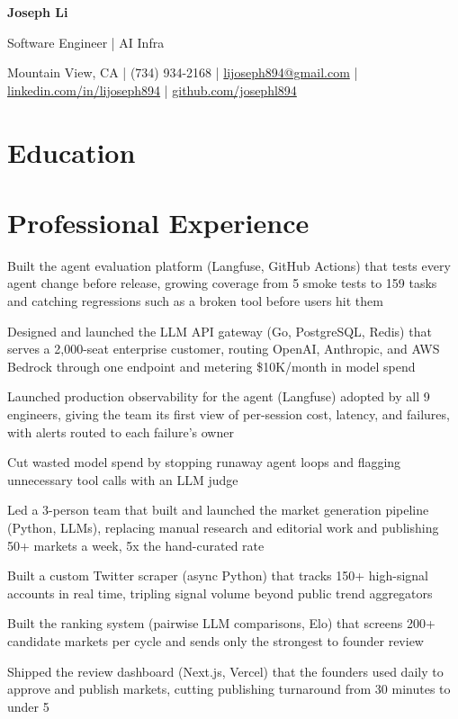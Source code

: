 \documentclass[10pt]{article}
\renewcommand{\resumeheader}[3]{%
  {\centering\fontsize{17}{19}\selectfont\bfseries\addfontfeature{LetterSpace=1.2}#1\par}%
  \vspace{3pt}%
  {\centering\fontsize{10.4}{12.5}\selectfont #2\par}%
  \vspace{2pt}%
  {\centering\fontsize{8.6}{10.4}\selectfont\color{subtle}#3\par}%
  \vspace{7pt}%
}
\begin{document}
\resumeheader{Joseph Li}{Software Engineer | AI Infra}{%
Mountain View, CA | (734) 934-2168 | \href{mailto:lijoseph894@gmail.com}{lijoseph894@gmail.com} | \href{https://www.linkedin.com/in/lijoseph894/}{linkedin.com/in/lijoseph894} | \href{https://github.com/josephl894}{github.com/josephl894}}

\section{Education}


\section{Professional Experience}
\begin{bullets}
  \item Built the agent evaluation platform (Langfuse, GitHub Actions) that tests every agent change before release, growing coverage from 5 smoke tests to 159 tasks and catching regressions such as a broken tool before users hit them
  \item Designed and launched the LLM API gateway (Go, PostgreSQL, Redis) that serves a 2,000-seat enterprise customer, routing OpenAI, Anthropic, and AWS Bedrock through one endpoint and metering \$10K/month in model spend
  \item Launched production observability for the agent (Langfuse) adopted by all 9 engineers, giving the team its first view of per-session cost, latency, and failures, with alerts routed to each failure's owner
  \item Cut wasted model spend by stopping runaway agent loops and flagging unnecessary tool calls with an LLM judge
\end{bullets}

\begin{bullets}
  \item Led a 3-person team that built and launched the market generation pipeline (Python, LLMs), replacing manual research and editorial work and publishing 50+ markets a week, 5x the hand-curated rate
  \item Built a custom Twitter scraper (async Python) that tracks 150+ high-signal accounts in real time, tripling signal volume beyond public trend aggregators
  \item Built the ranking system (pairwise LLM comparisons, Elo) that screens 200+ candidate markets per cycle and sends only the strongest to founder review
  \item Shipped the review dashboard (Next.js, Vercel) that the founders used daily to approve and publish markets, cutting publishing turnaround from 30 minutes to under 5
\end{bullets}
\end{document}
